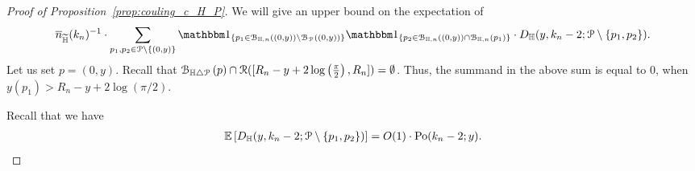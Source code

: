 \begin{proof}[Proof of Proposition~\ref{prop:couling_c_H_P}]
We will give an upper bound on the expectation of 
$$\expH^{-1} \cdot \sum_{p_1,p_2\in\Pcal \setminus \{(0,y)\}}\ind{p_1\in \BallHyp{(0,y)} \setminus 
\BallPo{(0,y)}}\ind{p_2 \in \BallHyp{(0,y)}\cap \BallHyp{p_1}} \cdot 
D_\H (y,k_n-2;\Pcal \setminus \{ p_1, p_2\}).$$
Let us set $p=(0,y)$. Recall that $\BallSym{p}\cap \Rcal([R_n - y + 2 \log\left(\frac{\pi}{2}\right),R_n]) = \emptyset$. Thus, the summand in the above sum is equal to 0, when 
$y(p_1) > R_n - y + 2 \log (\pi/2)$. 

Recall that  we have  
\begin{equation} \label{eq:ball_multitude}
\begin{split}
\Exp{D_\H (y,k_n-2;\Pcal \setminus \{ p_1, p_2\})}  =O(1)\cdot   \Pop{y}{k_n-2}.
\end{split}
\end{equation}




\end{proof}
